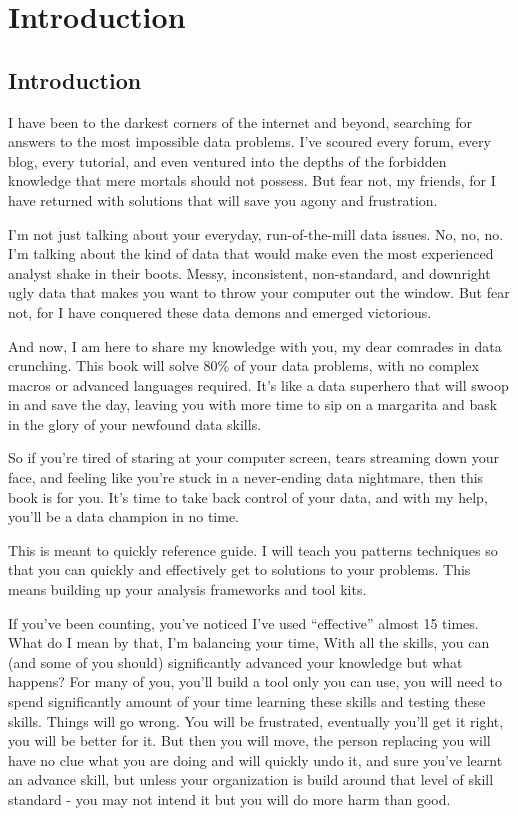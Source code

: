 \documentclass[
  letterpaper,
  DIV=11,
  numbers=noendperiod]{scrreprt}
\begin{document}
\part{Introduction}

\chapter*{Introduction}\label{introduction-2}


I have been to the darkest corners of the internet and beyond, searching
for answers to the most impossible data problems. I've scoured every
forum, every blog, every tutorial, and even ventured into the depths of
the forbidden knowledge that mere mortals should not possess. But fear
not, my friends, for I have returned with solutions that will save you
agony and frustration.

I'm not just talking about your everyday, run-of-the-mill data issues.
No, no, no. I'm talking about the kind of data that would make even the
most experienced analyst shake in their boots. Messy, inconsistent,
non-standard, and downright ugly data that makes you want to throw your
computer out the window. But fear not, for I have conquered these data
demons and emerged victorious.

And now, I am here to share my knowledge with you, my dear comrades in
data crunching. This book will solve 80\% of your data problems, with no
complex macros or advanced languages required. It's like a data
superhero that will swoop in and save the day, leaving you with more
time to sip on a margarita and bask in the glory of your newfound data
skills.

So if you're tired of staring at your computer screen, tears streaming
down your face, and feeling like you're stuck in a never-ending data
nightmare, then this book is for you. It's time to take back control of
your data, and with my help, you'll be a data champion in no time.

This is meant to quickly reference guide. I will teach you patterns
techniques so that you can quickly and effectively get to solutions to
your problems. This means building up your analysis frameworks and tool
kits.

If you've been counting, you've noticed I've used ``effective'' almost
15 times. What do I mean by that, I'm balancing your time, With all the
skills, you can (and some of you should) significantly advanced your
knowledge but what happens? For many of you, you'll build a tool only
you can use, you will need to spend significantly amount of your time
learning these skills and testing these skills. Things will go wrong.
You will be frustrated, eventually you'll get it right, you will be
better for it. But then you will move, the person replacing you will
have no clue what you are doing and will quickly undo it, and sure
you've learnt an advance skill, but unless your organization is build
around that level of skill standard - you may not intend it but you will
do more harm than good.
\end{document}
